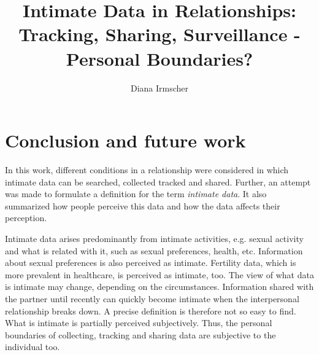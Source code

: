 \documentclass[journal]{vgtc}                %
\title{Intimate Data in Relationships: Tracking, Sharing, Surveillance - Personal Boundaries?}
\author{Diana Irmscher}
\begin{document}

\maketitle

%
%










%

\section{Conclusion and future work}
\label{sec:conculsion}
In this work, different conditions in a relationship  were considered in which intimate data can be searched, collected tracked and shared.
Further, an attempt was made to formulate a definition for the term \textit{intimate data}. It also summarized how people perceive this data and how the data affects their perception.

Intimate data arises predominantly from intimate activities, e.g. sexual activity and what is related with it, such as sexual preferences, health, etc. Information about sexual preferences is also perceived as intimate. Fertility data, which is more prevalent in healthcare, is perceived as intimate, too. The view of what data is intimate may change, depending on the circumstances. Information shared with the partner until recently can quickly become intimate when the interpersonal relationship breaks down. A precise definition is therefore not so easy to find. What is intimate is partially perceived subjectively. Thus, the personal boundaries of collecting, tracking and sharing data are subjective to the individual too.
\end{document}
